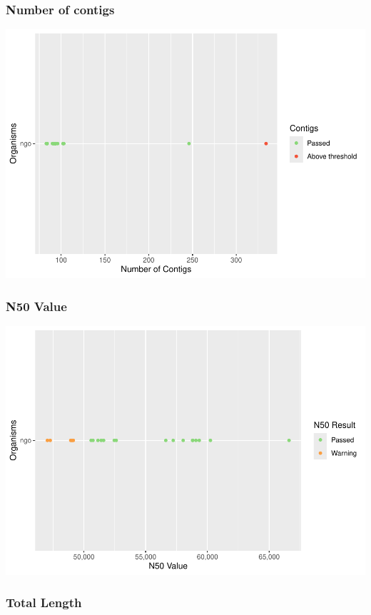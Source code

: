\documentclass[
  a4paper,
]{article}
\begin{document}
\subsubsection{Number of contigs}\label{number-of-contigs}

\includegraphics{qualifyr_report_2024-07-31_files/figure-latex/unnamed-chunk-1-1.pdf}

\subsubsection{N50 Value}\label{n50-value}

\includegraphics{qualifyr_report_2024-07-31_files/figure-latex/n50_result -1.pdf}

\subsubsection{Total Length}\label{total-length}
\end{document}
